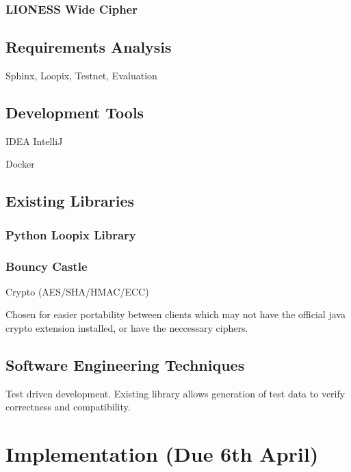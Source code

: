 \documentclass[12pt,a4paper,twoside,openright]{report}
\begin{document}
\subsection{LIONESS Wide Cipher}

\section{Requirements Analysis}

Sphinx, Loopix, Testnet, Evaluation

\section{Development Tools}

IDEA IntelliJ

Docker

\section{Existing Libraries}

\subsection{Python Loopix Library}

\subsection{Bouncy Castle}

Crypto (AES/SHA/HMAC/ECC)

Chosen for easier portability between clients which may not have the official java crypto extension installed, or have the neccessary ciphers.

\section{Software Engineering Techniques}

Test driven development. Existing library allows generation of test data to verify correctness and compatibility.


\chapter{Implementation (Due 6th April)}

\end{document}

